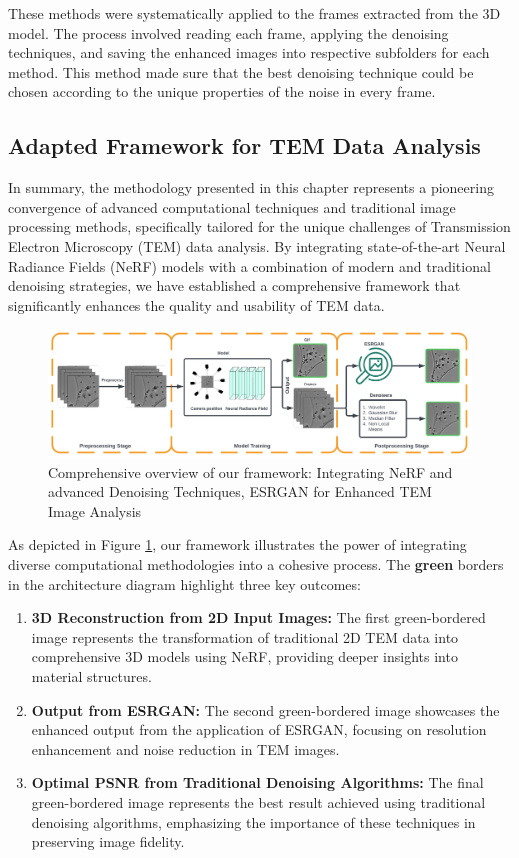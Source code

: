 These methods were systematically applied to the frames extracted from the 3D model. The process involved reading each frame, applying the denoising techniques, and saving the enhanced images into respective subfolders for each method. This method made sure that the best denoising technique could be chosen according to the unique properties of the noise in every frame.



\subsection{Adapted Framework for TEM Data Analysis}

In summary, the methodology presented in this chapter represents a pioneering convergence of advanced computational techniques and traditional image processing methods, specifically tailored for the unique challenges of Transmission Electron Microscopy (TEM) data analysis. By integrating state-of-the-art Neural Radiance Fields (NeRF) models with a combination of modern and traditional denoising strategies, we have established a comprehensive framework that significantly enhances the quality and usability of TEM data.

\begin{figure}[thbp]
    \centering
    \includegraphics[width=\textwidth]{img/Thesis Architecture Image.png}
    \caption{Comprehensive overview of our framework: Integrating NeRF and advanced Denoising Techniques, ESRGAN for Enhanced TEM Image Analysis}
    \label{fig:ThesisArchitecture}
\end{figure}

As depicted in Figure \ref{fig:ThesisArchitecture}, our framework illustrates the power of integrating diverse computational methodologies into a cohesive process. The \textbf{green} borders in the architecture diagram highlight three key outcomes:

\begin{enumerate}
    \item \textbf{3D Reconstruction from 2D Input Images:} The first green-bordered image represents the transformation of traditional 2D TEM data into comprehensive 3D models using NeRF, providing deeper insights into material structures.
    \item \textbf{Output from ESRGAN:} The second green-bordered image showcases the enhanced output from the application of ESRGAN, focusing on resolution enhancement and noise reduction in TEM images.
    \item \textbf{Optimal PSNR from Traditional Denoising Algorithms:} The final green-bordered image represents the best result achieved using traditional denoising algorithms, emphasizing the importance of these techniques in preserving image fidelity.
\end{enumerate}


